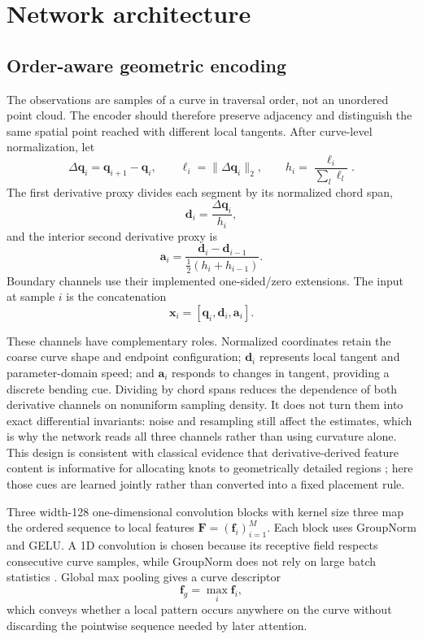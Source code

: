 \documentclass[preprint,12pt]{elsarticle}
\begin{document}
\section{Network architecture}

\subsection{Order-aware geometric encoding}
The observations are samples of a curve in traversal order, not an unordered
point cloud. The encoder should therefore preserve adjacency and distinguish
the same spatial point reached with different local tangents. After curve-level
normalization, let
\begin{equation}
\Delta\bm q_i=\bm q_{i+1}-\bm q_i,\qquad
\ell_i=\|\Delta\bm q_i\|_2,
\qquad h_i=\frac{\ell_i}{\sum_l\ell_l}.
\end{equation}
The first derivative proxy divides each segment by its normalized chord span,
\begin{equation}
\bm d_i=\frac{\Delta\bm q_i}{h_i},
\end{equation}
and the interior second derivative proxy is
\begin{equation}
\bm a_i=\frac{\bm d_i-\bm d_{i-1}}
{\tfrac12(h_i+h_{i-1})}.
\end{equation}
Boundary channels use their implemented one-sided/zero extensions. The input
at sample $i$ is the concatenation
\begin{equation}
\bm x_i=[\bm q_i,\bm d_i,\bm a_i].
\end{equation}

These channels have complementary roles. Normalized coordinates retain the
coarse curve shape and endpoint configuration; $\bm d_i$ represents local
tangent and parameter-domain speed; and $\bm a_i$ responds to changes in
tangent, providing a discrete bending cue. Dividing by chord spans reduces the
dependence of both derivative channels on nonuniform sampling density. It does
not turn them into exact differential invariants: noise and resampling still
affect the estimates, which is why the network reads all three channels rather
than using curvature alone. This design is consistent with classical evidence
that derivative-derived feature content is informative for allocating knots
to geometrically detailed regions \cite{yeh2020}; here those cues are learned
jointly rather than converted into a fixed placement rule.

Three width-128 one-dimensional convolution blocks with kernel size three map
the ordered sequence to local features $\bm F=(\bm f_i)_{i=1}^M$. Each block
uses GroupNorm and GELU. A 1D convolution is chosen because its receptive field
respects consecutive curve samples, while GroupNorm does not rely on large
batch statistics \cite{wu2018}. Global max pooling gives a curve descriptor
\begin{equation}
\bm f_g=\max_i\bm f_i,
\end{equation}
which conveys whether a local pattern occurs anywhere on the curve without
discarding the pointwise sequence needed by later attention.
\end{document}
